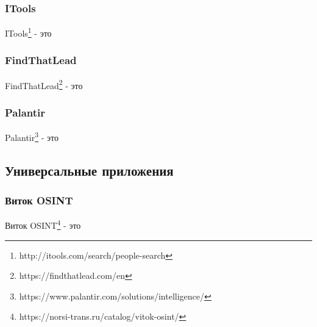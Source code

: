 \subsubsection{ITools}
ITools\footnote{http://itools.com/search/people-search} - это


\subsubsection{FindThatLead}
FindThatLead\footnote{https://findthatlead.com/en} - это


\subsubsection{Palantir}
Palantir\footnote{https://www.palantir.com/solutions/intelligence/} - это

\subsection{Универсальные приложения}
\subsubsection{Виток OSINT}
Виток OSINT\footnote{https://norsi-trans.ru/catalog/vitok-osint/} - это
